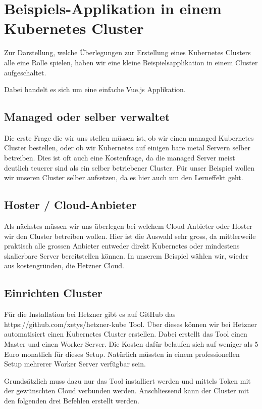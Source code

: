 \section{Beispiels-Applikation in einem Kubernetes Cluster}
Zur Darstellung, welche Überlegungen zur Erstellung eines Kubernetes Clusters alle eine Rolle spielen, haben wir eine kleine Beispielsapplikation in einem Cluster aufgeschaltet.

Dabei handelt es sich um eine einfache Vue.js Applikation.

\subsection{Managed oder selber verwaltet}
Die erste Frage die wir uns stellen müssen ist, ob wir einen managed Kubernetes Cluster bestellen, oder ob wir Kubernetes auf einigen bare metal Servern selber betreiben.
Dies ist oft auch eine Kostenfrage, da die managed Server meist deutlich teuerer sind als ein selber betriebener Cluster. Für unser Beispiel wollen wir unseren Cluster selber aufsetzen, da es hier auch um den Lerneffekt geht.

\subsection{Hoster / Cloud-Anbieter}
Als nächstes müssen wir uns überlegen bei welchem Cloud Anbieter oder Hoster wir den Cluster betreiben wollen. Hier ist die Auswahl sehr gross, da mittlerweile praktisch alle grossen Anbieter entweder direkt Kubernetes oder mindestens skalierbare Server bereitstellen können. 
In unserem Beispiel wählen wir, wieder aus kostengründen, die Hetzner Cloud.

\subsection{Einrichten Cluster}
Für die Installation bei Hetzner gibt es auf GitHub das https://github.com/xetys/hetzner-kube Tool. Über dieses können wir bei Hetzner automatisiert einen Kubernetes Cluster erstellen. Dabei erstellt das Tool einen Master und einen Worker Server. Die Kosten dafür belaufen sich auf weniger als 5 Euro monatlich für dieses Setup. Natürlich müssten in einem professionellen Setup mehrerer Worker Server verfügbar sein.

Grundsätzlich muss dazu nur das Tool installiert werden und mittels Token mit der gewünschten Cloud verbunden werden. Anschliessend kann der Cluster mit den folgenden drei Befehlen erstellt werden.

